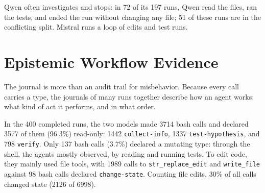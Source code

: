 \documentclass{IEEEcsmag}
\begin{document}
Qwen often investigates and stops: in 72 of its 197 runs, Qwen read the files, ran the tests, and ended the run without changing any file; 51 of these runs are in the conflicting split. Mistral runs a loop of edits and test runs.


\section{Epistemic Workflow Evidence}

The journal is more than an audit trail for misbehavior. Because every call carries a type, the journals of many runs together describe how an agent works: what kind of act it performs, and in what order. 

In the 400 completed runs, the two models made 3714 bash calls and declared 3577 of them (96.3\%) read-only: 1442 \texttt{collect-info}, 1337 \texttt{test-hypothesis}, and 798 \texttt{verify}. Only 137 bash calls (3.7\%) declared a mutating type: through the shell, the agents mostly observed, by reading and running tests. To edit code, they mainly used file tools, with 1989 calls to \texttt{str\_replace\_edit} and \texttt{write\_file} against 98 bash calls declared \texttt{change-state}. Counting file edits, 30\% of all calls changed state (2126 of 6998).
\end{document}
